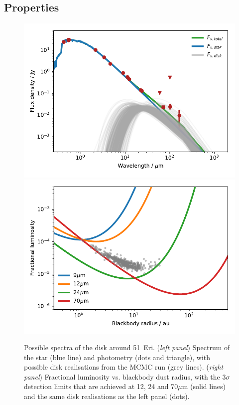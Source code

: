 \documentclass[a4paper,fleqn,usenatbib]{mnras}
\begin{document}
\subsection{Properties}\label{s:51eri:ss:prop}

\begin{figure}
  \includegraphics[width=\columnwidth]{sed_51eri.pdf}
  \includegraphics[width=\columnwidth]{f_r_51eri.pdf}
  \caption{Possible spectra of the disk around 51~Eri. (\emph{left
      panel}) Spectrum of the star (blue line) and photometry (dots and
    triangle), with possible disk realisations from the MCMC run (grey
    lines). (\emph{right panel}) Fractional luminosity vs. blackbody
    dust radius, with the 3$\sigma$ detection limits that are achieved
    at 12, 24 and 70$\mu$m (solid lines) and the same disk realisations
    as the left panel (dots).}
    \label{fig:sed_51eri}
\end{figure}
\end{document}
